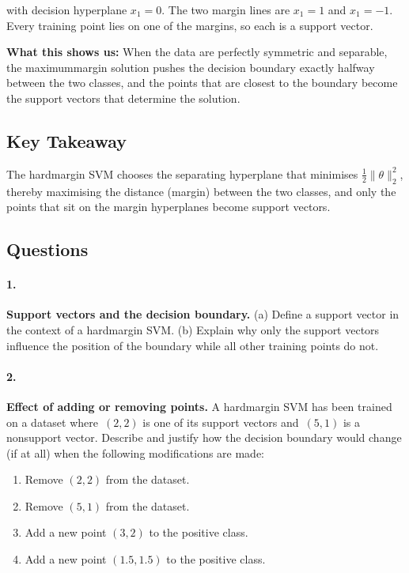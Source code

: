 \documentclass[12pt, a4paper]{article}
\begin{document}
with decision hyperplane \(x_{1}=0\).  The two margin lines are \(x_{1}=1\) and \(x_{1}=-1\).  Every training point lies on one of the margins, so each is a support vector.

\textbf{What this shows us:}  When the data are perfectly symmetric and separable, the maximummargin solution pushes the decision boundary exactly halfway between the two classes, and the points that are closest to the boundary become the support vectors that determine the solution.  

\subsection{Key Takeaway}
The hardmargin SVM chooses the separating hyperplane that minimises \(\tfrac12\|\theta\|_{2}^{2}\), thereby maximising the distance (margin) between the two classes, and only the points that sit on the margin hyperplanes become support vectors.

\subsection*{Questions}
\newpage
\paragraph{1.} \textbf{Support vectors and the decision boundary.}  
(a) Define a support vector in the context of a hardmargin SVM.  
(b) Explain why only the support vectors influence the position of the boundary while all other training points do not.

\newpage
\paragraph{2.} \textbf{Effect of adding or removing points.}  
A hardmargin SVM has been trained on a dataset where  
\(\,(2,2)\) is one of its support vectors and \(\,(5,1)\) is a nonsupport vector.  
Describe and justify how the decision boundary would change (if at all) when the following modifications are made:  

\begin{enumerate}
\item Remove \((2,2)\) from the dataset.  
\item Remove \((5,1)\) from the dataset.  
\item Add a new point \((3,2)\) to the positive class.  
\item Add a new point \((1.5,1.5)\) to the positive class.
\end{enumerate}
\end{document}
